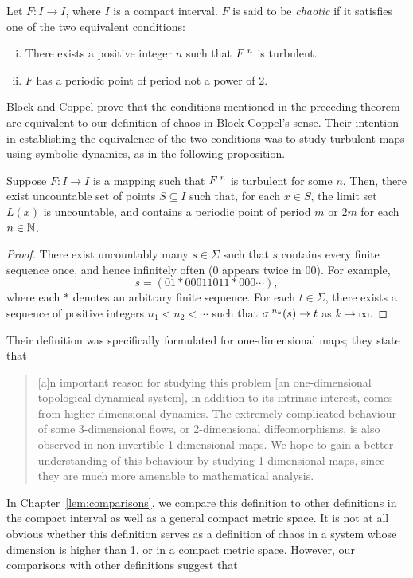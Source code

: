 \documentclass[10pt,twoside]{book}
\begin{document}
\begin{theorem}
  \citep[Chap.II]{blockcoppel}
  Let $F: I \to I$, where $I$ is a compact interval.
  $F$ is said to be \textit{chaotic} if it satisfies one of the two equivalent conditions:
  \begin{enumerate}[(i)]
    \item There exists a positive integer $n$ such that $F^{\;n}$ is turbulent.
    \item $F$ has a periodic point of period not a power of 2.
  \end{enumerate}
  \label{thm:blcpII}
\end{theorem}
Block and Coppel prove that the conditions mentioned in the preceding theorem are equivalent to our definition of chaos in Block-Coppel's sense.
Their intention in establishing the equivalence of the two conditions was to study turbulent maps using symbolic dynamics, as in the following proposition.
\begin{proposition}
  Suppose $F: I \to I$ is a mapping such that $F^{\;n}$ is turbulent for some $n$.
  Then, there exist uncountable set of points $S \subseteq I$ such that, for each $x \in S$, the limit set $L(x)$ is uncountable, and contains a periodic point of period $m$ or $2m$ for each $n \in \mathbb{N}$.
  \begin{proof}
    There exist uncountably many $s \in \Sigma$ such that $s$ contains every finite sequence once, and hence infinitely often (0 appears twice in 00).
    For example,
    \begin{equation*}
      s = (01*00011011*000 \cdots),
    \end{equation*}
    where each $*$ denotes an arbitrary finite sequence.
    For each $t \in \Sigma$, there exists a sequence of positive integers $n_1 < n_2 < \cdots$ such that $\sigma^{\;n_k}(s) \to t$ as $k \to \infty$.
  \end{proof}
\end{proposition}
Their definition was specifically formulated for one-dimensional maps; they state that
\begin{quotation}
  [a]n important reason for studying this problem [an one-dimensional topological dynamical system], in addition to its intrinsic interest, comes from higher-dimensional dynamics.
  The extremely complicated behaviour of some 3-dimensional flows, or 2-dimensional diffeomorphisms, is also observed in non-invertible 1-dimensional maps.
  We hope to gain a better understanding of this behaviour by studying 1-dimensional maps, since they are much more amenable to mathematical analysis.
\end{quotation}
In Chapter~\ref{lem:comparisons}, we compare this definition to other definitions in the compact interval as well as a general compact metric space.
It is not at all obvious whether this definition serves as a definition of chaos in a system whose dimension is higher than 1, or in a compact metric space.
However, our comparisons with other definitions suggest that 




\printindex
\end{document}

